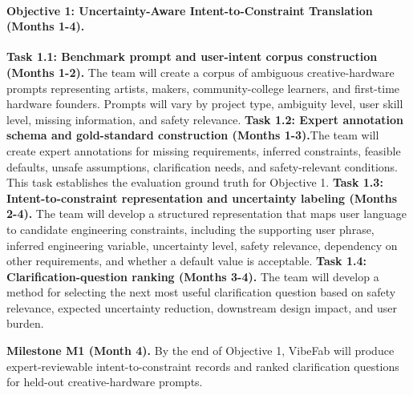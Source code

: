 \vspace{-10pt}
\paragraph{Objective 1: Uncertainty-Aware Intent-to-Constraint Translation (Months 1-4).} 
\textbf{Task 1.1: Benchmark prompt and user-intent corpus construction (Months 1-2).} The team will create a corpus of ambiguous creative-hardware prompts representing artists, makers, community-college learners, and first-time hardware founders. Prompts will vary by project type, ambiguity level, user skill level, missing information, and safety relevance. 
\textbf{Task 1.2: Expert annotation schema and gold-standard construction (Months 1-3).}The team will create expert annotations for missing requirements, inferred constraints, feasible defaults, unsafe assumptions, clarification needs, and safety-relevant conditions. This task establishes the evaluation ground truth for Objective 1. 
\textbf{Task 1.3: Intent-to-constraint representation and uncertainty labeling (Months 2-4).} The team will develop a structured representation that maps user language to candidate engineering constraints, including the supporting user phrase, inferred engineering variable, uncertainty level, safety relevance, dependency on other requirements, and whether a default value is acceptable. 
\textbf{Task 1.4: Clarification-question ranking (Months 3-4).} The team will develop a method for selecting the next most useful clarification question based on safety relevance, expected uncertainty reduction, downstream design impact, and user burden.

\textbf{Milestone M1 (Month 4).}
By the end of Objective 1, VibeFab will produce expert-reviewable intent-to-constraint records and ranked clarification questions for held-out creative-hardware prompts.

\vspace{-10pt}
